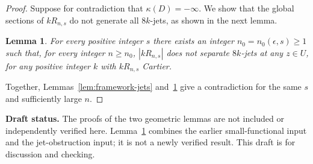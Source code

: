 \documentclass[12pt,a4paper,psamsfonts]{amsart}
\theoremstyle{definition}
\theoremstyle{plain}
\newtheorem{lemma}{Lemma}[section]
\begin{document}
\begin{proof}
Suppose for contradiction that $\kappa(D)=-\infty$.
We show that the global sections of $kR_{n,s}$ do not generate all
$8k$-jets, as shown in the next lemma.

\begin{lemma}\label{lem:framework-obstruction}
For every positive integer $s$ there exists
an integer $n_0=n_0(\epsilon,s)\ge1$ such that, for every integer
$n\ge n_0$, $|kR_{n,s}|$ does not separate $8k$-jets at any $z\in U$,
for any positive integer $k$ with $kR_{n,s}$ Cartier.
\end{lemma}

Together, Lemmas~\ref{lem:framework-jets} and~\ref{lem:framework-obstruction}
give a contradiction for the same $s$ and sufficiently large $n$.\qedhere
\end{proof}

\medskip
\noindent\textbf{Draft status.}
The proofs of the two geometric lemmas are not included or independently
verified here. Lemma~\ref{lem:framework-obstruction} combines the earlier
small-functional input and the jet-obstruction input; it is not a newly
verified result. This draft is for discussion and checking.
\end{document}
